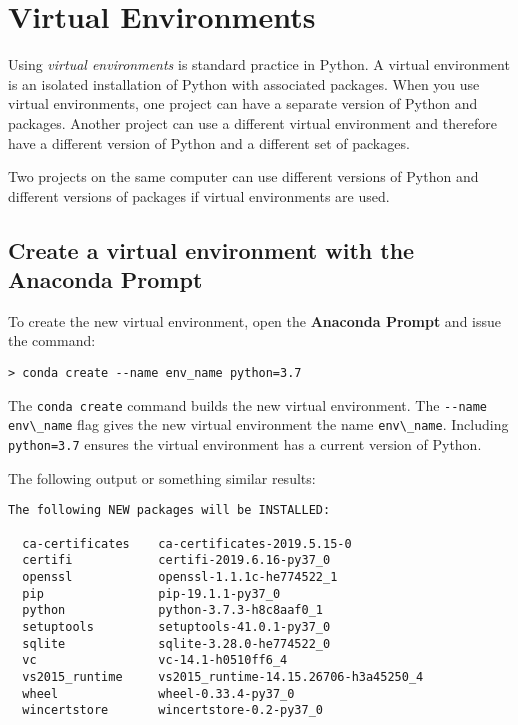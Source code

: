 \documentclass{book}
\newcommand{\passthrough}[1]{#1}
\begin{document}
    
        \hypertarget{virtual-environments}{%
\section{Virtual Environments}\label{virtual-environments}}
    




    
        Using \emph{virtual environments} is standard practice in Python. A
virtual environment is an isolated installation of Python with
associated packages. When you use virtual environments, one project can
have a separate version of Python and packages. Another project can use
a different virtual environment and therefore have a different version
of Python and a different set of packages.

Two projects on the same computer can use different versions of Python
and different versions of packages if virtual environments are used.
    




    
        \hypertarget{create-a-virtual-environment-with-the-anaconda-prompt}{%
\subsection{Create a virtual environment with the Anaconda
Prompt}\label{create-a-virtual-environment-with-the-anaconda-prompt}}

To create the new virtual environment, open the \textbf{Anaconda Prompt}
and issue the command:

\begin{lstlisting}
> conda create --name env_name python=3.7
\end{lstlisting}

The \passthrough{\lstinline!conda create!} command builds the new
virtual environment. The \passthrough{\lstinline!--name env\_name!} flag
gives the new virtual environment the name
\passthrough{\lstinline!env\_name!}. Including
\passthrough{\lstinline!python=3.7!} ensures the virtual environment has
a current version of Python.

The following output or something similar results:

\begin{lstlisting}
The following NEW packages will be INSTALLED:

  ca-certificates    ca-certificates-2019.5.15-0
  certifi            certifi-2019.6.16-py37_0
  openssl            openssl-1.1.1c-he774522_1
  pip                pip-19.1.1-py37_0
  python             python-3.7.3-h8c8aaf0_1
  setuptools         setuptools-41.0.1-py37_0
  sqlite             sqlite-3.28.0-he774522_0
  vc                 vc-14.1-h0510ff6_4
  vs2015_runtime     vs2015_runtime-14.15.26706-h3a45250_4
  wheel              wheel-0.33.4-py37_0
  wincertstore       wincertstore-0.2-py37_0
\end{lstlisting}
\end{document}
